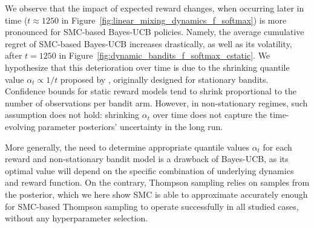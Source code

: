 We observe that the impact of expected reward changes,
when occurring later in time
(\eg $t\approx1250$ in Figure~\ref{fig:linear_mixing_dynamics_f_softmax})
is more pronounced for SMC-based Bayes-UCB policies.
Namely, the average cumulative regret of SMC-based Bayes-UCB increases drastically, as well as its volatility,
after $t=1250$ in Figure~\ref{fig:dynamic_bandits_f_softmax_cstatic}.
%
We hypothesize that this deterioration over time is
due to the shrinking quantile value $\alpha_t\propto1/t$ proposed by \citet{ip-Kaufmann2012}, 
originally designed for stationary bandits.
Confidence bounds for static reward models tend to shrink proportional to the number of observations per bandit arm.
However, in non-stationary regimes, such assumption does not hold:
shrinking $\alpha_t$ over time does not capture the time-evolving parameter posteriors' uncertainty in the long run. 

More generally, the need to determine appropriate quantile values $\alpha_t$
for each reward and non-stationary bandit model is a drawback of Bayes-UCB,
as its optimal value will depend on the specific combination of underlying dynamics and reward function.
%
On the contrary, Thompson sampling relies on samples from the posterior,
which we here show SMC is able to approximate accurately enough
for SMC-based Thompson sampling to operate successfully in all studied cases,
without any hyperparameter selection.


